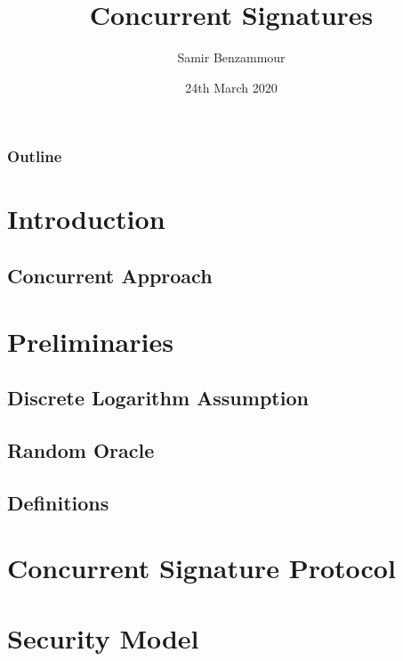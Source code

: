 \documentclass{beamer}
\title{Concurrent Signatures}
\author{Samir Benzammour}
\date{24th March 2020}
\institute[RWTH]{
  Algorithms and Computational Complexity\\
  RWTH Aachen University
}
\begin{document}
\frame{\titlepage}

\begin{frame}
	\frametitle{Outline}
	\tableofcontents
\end{frame}

\section{Introduction}


\subsection{Concurrent Approach}


\section{Preliminaries}
% 

\subsection{Discrete Logarithm Assumption}


\subsection{Random Oracle}


\subsection{Definitions}


\section{Concurrent Signature Protocol}


\section{Security Model}

\end{document}
